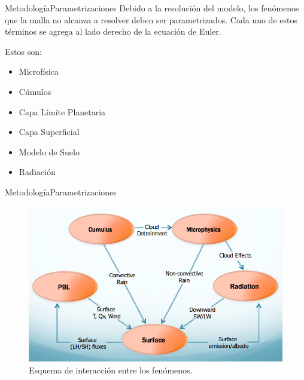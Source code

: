 \documentclass[mathserif]{beamer}
\begin{document}
\begin{frame}{Metodología}{Parametrizaciones}
Debido a la resolución del modelo, los fenómenos que la malla no alcanza a resolver deben ser parametrizados. Cada uno de estos términos se agrega al lado derecho de la ecuación de Euler.

Estos son:

	\begin{itemize}
		\item Microfísica
		\item Cúmulos
		\item Capa Límite Planetaria
		\item Capa Superficial
		\item Modelo de Suelo
		\item Radiación
	\end{itemize}
\end{frame}

\begin{frame}{Metodología}{Parametrizaciones}
	\begin{figure}[H]
		\centering
		\includegraphics[width=0.95\linewidth]{param}
		\caption{Esquema de interacción entre los fenómenos.}
		\label{fig:param}
	\end{figure}
\end{frame}
\end{document}
